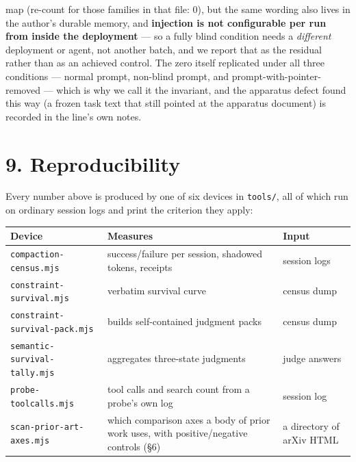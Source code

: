 \documentclass[
]{article}
\newcounter{none} %
\begin{document}
\begin{enumerate}
  map (re-count for those families in that file: 0), but the same
  wording also lives in the author's durable memory, and
  \textbf{injection is not configurable per run from inside the
  deployment} --- so a fully blind condition needs a \emph{different}
  deployment or agent, not another batch, and we report that as the
  residual rather than as an achieved control. The zero itself
  replicated under all three conditions --- normal prompt, non-blind
  prompt, and prompt-with-pointer-removed --- which is why we call it
  the invariant, and the apparatus defect found this way (a frozen task
  text that still pointed at the apparatus document) is recorded in the
  line's own notes.
\end{enumerate}

\section{9. Reproducibility}\label{reproducibility}

Every number above is produced by one of six devices in \texttt{tools/},
all of which run on ordinary session logs and print the criterion they
apply:

{\def\LTcaptype{none} %
\begin{longtable}[]{@{}
  >{\raggedright\arraybackslash}p{}
  >{\raggedright\arraybackslash}p{}
  >{\raggedright\arraybackslash}p{}@{}}
\toprule\noalign{}
\begin{minipage}[b]{\linewidth}\raggedright
Device
\end{minipage} & \begin{minipage}[b]{\linewidth}\raggedright
Measures
\end{minipage} & \begin{minipage}[b]{\linewidth}\raggedright
Input
\end{minipage} \\
\midrule\noalign{}
\endhead
\bottomrule\noalign{}
\endlastfoot
\texttt{compaction-census.mjs} & success/failure per session, shadowed
tokens, receipts & session logs \\
\texttt{constraint-survival.mjs} & verbatim survival curve & census
dump \\
\texttt{constraint-survival-pack.mjs} & builds self-contained judgment
packs & census dump \\
\texttt{semantic-survival-tally.mjs} & aggregates three-state judgments
& judge answers \\
\texttt{probe-toolcalls.mjs} & tool calls and search count from a
probe's own log & session log \\
\texttt{scan-prior-art-axes.mjs} & which comparison axes a body of prior
work uses, with positive/negative controls (§6) & a directory of arXiv
HTML \\
\end{longtable}
}
\end{document}
